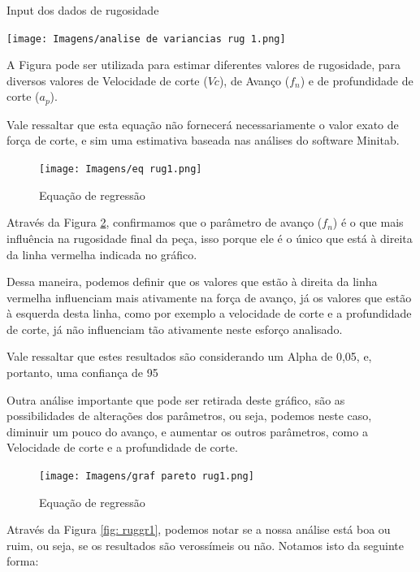 \documentclass[deposito, acronym, symbols]{fei}
\begin{document}
\begin{table}[!htb]
 \centering
    \caption{Input dos dados de rugosidade}
    \texttt{[image: Imagens/analise de variancias rug 1.png]}
    \label{tab: rugvar1}
 \end{table}

A Figura  pode ser utilizada para estimar diferentes valores de rugosidade, para diversos valores de Velocidade de corte ($Vc$), de Avanço ($f_n$) e de profundidade de corte ($a_p$). 

Vale ressaltar que esta equação não fornecerá necessariamente o valor exato de força de corte, e sim uma estimativa baseada nas análises do software Minitab. 

\begin{figure}[!htp]
    \centering
    \caption{Equação de regressão}
    \texttt{[image: Imagens/eq rug1.png]}
    \label{fig: eqrug1}
\end{figure}

Através da Figura \ref{fig: ruggp1}, confirmamos que o parâmetro de avanço ($f_n$) é o que mais influência na rugosidade final da peça, isso porque ele é o único que está à direita da linha vermelha indicada no gráfico. 

Dessa maneira, podemos definir que os valores que estão à direita da linha vermelha influenciam mais ativamente na força de avanço, já os valores que estão à esquerda desta linha, como por exemplo a velocidade de corte e a profundidade de corte, já não influenciam tão ativamente neste esforço analisado. 

Vale ressaltar que estes resultados são considerando um Alpha de 0,05, e, portanto, uma confiança de 95%

Outra análise importante que pode ser retirada deste gráfico, são as possibilidades de alterações dos parâmetros, ou seja, podemos neste caso, diminuir um pouco do avanço, e aumentar os outros parâmetros, como a Velocidade de corte e a profundidade de corte. 

\begin{figure}[!htp]
    \centering
    \caption{Equação de regressão}
    \texttt{[image: Imagens/graf pareto rug1.png]}
    \label{fig: ruggp1}
\end{figure}

Através da Figura \ref{fig: ruggr1}, podemos notar se a nossa análise está boa ou ruim, ou seja, se os resultados são verossímeis ou não. Notamos isto da seguinte forma: 
\end{document}
